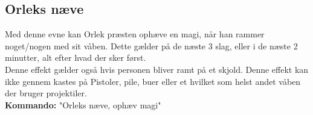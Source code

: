 \subsection*{Orleks næve} 
Med denne evne kan Orlek præsten ophæve en magi, når han rammer noget/nogen med sit våben. Dette gælder på de næste 3 slag, eller i de næste 2 minutter, alt efter hvad der sker først.\\
Denne effekt gælder også hvis personen bliver ramt på et skjold. Denne effekt kan ikke gennem kastes på Pistoler, pile, buer eller et hvilket som helst andet våben der bruger projektiler.\\
\textbf{Kommando:} "Orleks næve, ophæv magi"\\
